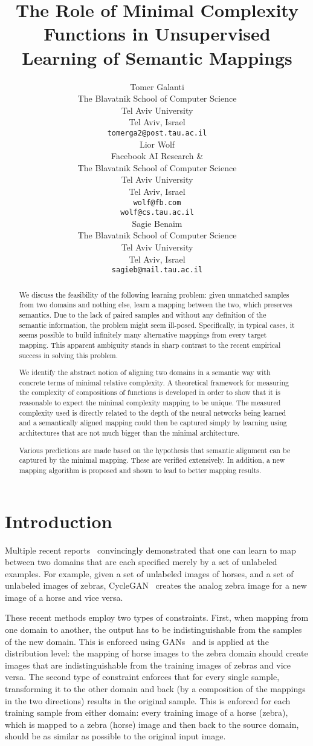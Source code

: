 \documentclass{article} %
\title{The Role of Minimal Complexity Functions in Unsupervised Learning of Semantic Mappings}
\author{Tomer Galanti \\
The Blavatnik School of Computer Science \\
Tel Aviv University \\
Tel Aviv, Israel \\
\texttt{tomerga2@post.tau.ac.il} \\
\And
Lior Wolf \\
Facebook AI Research \& \\
The Blavatnik School of Computer Science \\
Tel Aviv University \\
Tel Aviv, Israel \\
\texttt{wolf@fb.com} \\
\texttt{wolf@cs.tau.ac.il} \\
\And
Sagie Benaim \\
The Blavatnik School of Computer Science \\
Tel Aviv University \\
Tel Aviv, Israel \\
\texttt{sagieb@mail.tau.ac.il} \\
}
\begin{document}
\maketitle

\begin{abstract}
We discuss the feasibility of the following learning problem: given unmatched samples from two domains and nothing else, learn a mapping between the two, which preserves semantics. Due to the lack of paired samples and without any definition of the semantic information, the problem might seem ill-posed. Specifically, in typical cases, it seems possible to build infinitely many alternative mappings  from every target mapping. This apparent ambiguity stands in sharp contrast to the recent empirical success in solving this problem.

We identify the abstract notion of aligning two domains in a semantic way with concrete terms of minimal relative complexity. A theoretical framework for measuring the complexity of compositions of functions is developed in order to show that it is reasonable to expect the minimal complexity mapping to be unique. The measured complexity used is directly related to the depth of the neural networks being learned and a semantically aligned mapping could then be captured simply by learning using architectures that are not much bigger than the minimal architecture.

Various predictions are made based on the hypothesis that semantic alignment can be captured by the minimal mapping. These are verified extensively. In addition, a new mapping algorithm is proposed and shown to lead to better mapping results.
\end{abstract}


\section{Introduction}
Multiple recent reports~\citep{xia2016dual,discogan,CycleGAN2017,dualgan} convincingly demonstrated that one can learn to map between two domains that are each specified merely by a set of unlabeled examples. For example, given a set of unlabeled images of horses, and a set of unlabeled images of zebras, CycleGAN~\citep{CycleGAN2017} creates the analog zebra image for a new image of a horse and vice versa.

These recent methods employ two types of constraints. First, when mapping from one domain to another, the output has to be indistinguishable from the samples of the new domain. This is enforced using GANs~\citep{gan} and is applied at the distribution level: the mapping of horse images to the zebra domain should create images that are indistinguishable from the training images of zebras and vice versa. The second type of constraint enforces that for every single sample, transforming it to the other domain and back (by a composition of the mappings in the two directions) results in the original sample. This is enforced for each training sample from either domain: every training image of a horse (zebra), which is mapped to a zebra (horse) image and then back to the source domain, should be as similar as possible to the original input image.
\end{document}
